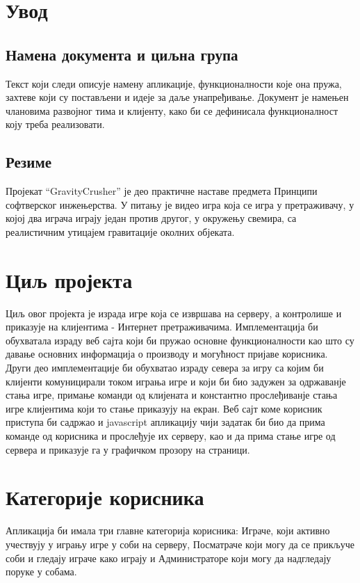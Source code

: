 \section{Увод}

\subsection{Намена документа и циљна група}
Текст који следи описује намену апликације, функционалности које она пружа, захтеве који су постављени и идеје за даље унапређивање. Документ је намењен члановима развојног тима и клијенту, како би се дефинисала функционалност коју треба реализовати.

\subsection{Резиме}
Пројекат “GravityCrusher” је део практичне наставе предмета Принципи софтверског инжењерства. У питању је видео игра која се игра у претраживачу, у којој два играча играју један против другог, у окружењу свемира, са реалистичним утицајем гравитације околних објеката.

\section{Циљ пројекта}
Циљ овог пројекта је израда игре која се извршава на серверу, а контролише и приказује на клијентима - Интернет претраживачима. Имплементација би обухватала израду веб сајта који би пружао основне функционалности као што су давање основних информација о производу и могућност пријаве корисника. Други део имплементације би обухватао израду севера за игру са којим би клијенти комуницирали током играња игре и који би био задужен за одржаванје стања игре, примање команди од клијената и константно прослеђиванје стања игре клијентима који то стање приказују на екран. Веб сајт коме корисник приступа би садржао и javascript апликацију чији задатак би био да прима команде од корисника и прослеђује их серверу, као и да прима стање игре од сервера и приказује га у графичком прозору на страници.

\section{Категорије корисника}
Апликација би имала три главне категорија корисника: Играче, који активно учествују у игрању игре у соби на серверу, Посматраче који могу да се прикључе соби и гледају играче како играју и Администраторе који могу да надгледају поруке у собама.

